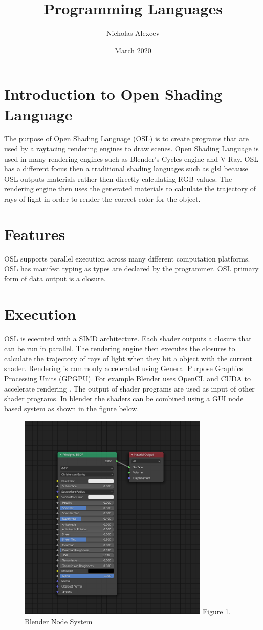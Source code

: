 \documentclass{article}
\title{Programming Languages}
\author{Nicholas Alexeev}
\date{March 2020}
\begin{document}
\maketitle

\section{Introduction to Open Shading Language}
The purpose of Open Shading Language (OSL) is to create programs that are used by a raytacing rendering engines to draw scenes. Open Shading Language is used in many rendering engines such as Blender's Cycles engine and V-Ray. OSL has a different focus then a traditional shading languages such as glsl because OSL outputs materials rather then directly calculating RGB values. The rendering engine then uses the generated materials to calculate the trajectory of rays of light in order to render the correct color for the object. 
\section{Features}
OSL supports parallel execution across many different computation platforms. OSL has manifest typing as types are declared by the programmer. OSL primary form of data output is a closure.
\section{Execution}
OSL is ececuted with a SIMD architecture. Each shader outputs a closure that can be run in parallel. The rendering engine then executes the closures to calculate the trajectory of rays of light when they hit a object with the current shader.  Rendering is commonly accelerated using General Purpose Graphics Processing Units (GPGPU). For example Blender uses OpenCL and CUDA to accelerate rendering \cite{blender_gpu}. The output of shader programs are used as input of other shader programs. In blender the shaders can be combined using a GUI node based system as shown in the figure below. \newline
\begin{figure}
  \includegraphics[height=10cm]{blender_nodes.png}\newline
  Figure 1. Blender Node System
  \centering
\end{figure}
\newline
\end{document}
